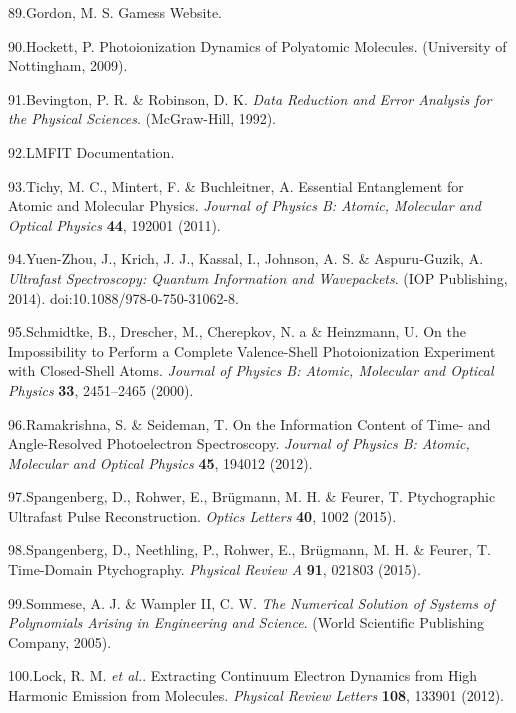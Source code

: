 \documentclass[10pt]{article}
\begin{document}
\label{csl:89}89.Gordon, M. S. {Gamess Website}.

\label{csl:90}90.Hockett, P. {Photoionization Dynamics of Polyatomic Molecules}. (University of Nottingham, 2009).

\label{csl:91}91.Bevington, P. R. \& Robinson, D. K. \textit{{Data {{Reduction}} and {{Error Analysis}} for the {{Physical Sciences}}}}. ({McGraw-Hill}, 1992).

\label{csl:92}92.{{{LMFIT}} Documentation}.

\label{csl:93}93.Tichy, M. C., Mintert, F. \& Buchleitner, A. {Essential Entanglement for Atomic and Molecular Physics}. \textit{Journal of Physics B: Atomic, Molecular and Optical Physics} \textbf{44}, 192001 (2011).

\label{csl:94}94.{Yuen-Zhou}, J., Krich, J. J., Kassal, I., Johnson, A. S. \& {Aspuru-Guzik}, A. \textit{{Ultrafast {{Spectroscopy}}: {{Quantum Information}} and {{Wavepackets}}}}. ({IOP Publishing}, 2014). doi:10.1088/978-0-750-31062-8.

\label{csl:95}95.Schmidtke, B., Drescher, M., Cherepkov, N. a \& Heinzmann, U. {On the Impossibility to Perform a Complete Valence-Shell Photoionization Experiment with Closed-Shell Atoms}. \textit{Journal of Physics B: Atomic, Molecular and Optical Physics} \textbf{33}, 2451–2465 (2000).

\label{csl:96}96.Ramakrishna, S. \& Seideman, T. {On the Information Content of Time- and Angle-Resolved Photoelectron Spectroscopy}. \textit{Journal of Physics B: Atomic, Molecular and Optical Physics} \textbf{45}, 194012 (2012).

\label{csl:97}97.Spangenberg, D., Rohwer, E., Br{\"u}gmann, M. H. \& Feurer, T. {Ptychographic Ultrafast Pulse Reconstruction}. \textit{Optics Letters} \textbf{40}, 1002 (2015).

\label{csl:98}98.Spangenberg, D., Neethling, P., Rohwer, E., Br{\"u}gmann, M. H. \& Feurer, T. {Time-Domain Ptychography}. \textit{Physical Review A} \textbf{91}, 021803 (2015).

\label{csl:99}99.Sommese, A. J. \& Wampler II, C. W. \textit{{The {{Numerical Solution}} of {{Systems}} of {{Polynomials Arising}} in {{Engineering}} and {{Science}}}}. ({World Scientific Publishing Company}, 2005).

\label{csl:100}100.Lock, R. M. \textit{et al.}. {Extracting {{Continuum Electron Dynamics}} from {{High Harmonic Emission}} from {{Molecules}}}. \textit{Physical Review Letters} \textbf{108}, 133901 (2012).
\end{document}
